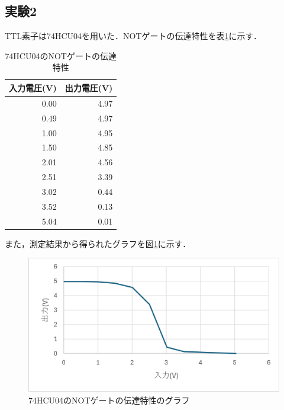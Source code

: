 \documentclass{jlreq}
\numberwithin{equation}{section}
\begin{document}
\subsection{実験2}
TTL素子は74HCU04を用いた．NOTゲートの伝達特性を表\ref{tab:74HCU04_io_feature}に示す．
\begin{table}[H]
  \centering
  \caption{74HCU04のNOTゲートの伝達特性}
  \begin{tabular}{|r|r|}
    \hline
    入力電圧(V) & 出力電圧(V) \\ \hline
    0.00        & 4.97        \\ \hline
    0.49        & 4.97        \\ \hline
    1.00        & 4.95        \\ \hline
    1.50        & 4.85        \\ \hline
    2.01        & 4.56        \\ \hline
    2.51        & 3.39        \\ \hline
    3.02        & 0.44        \\ \hline
    3.52        & 0.13        \\ \hline
    5.04        & 0.01        \\ \hline
  \end{tabular}
  \label{tab:74HCU04_io_feature}
\end{table}

また，測定結果から得られたグラフを図\ref{fig:74HCU04_io_feature}に示す．
\begin{figure}[H]
  \centering
  \includegraphics{assets/74HCU04_io_feature.png}
  \caption{74HCU04のNOTゲートの伝達特性のグラフ}
  \label{fig:74HCU04_io_feature}
\end{figure}
\end{document}
